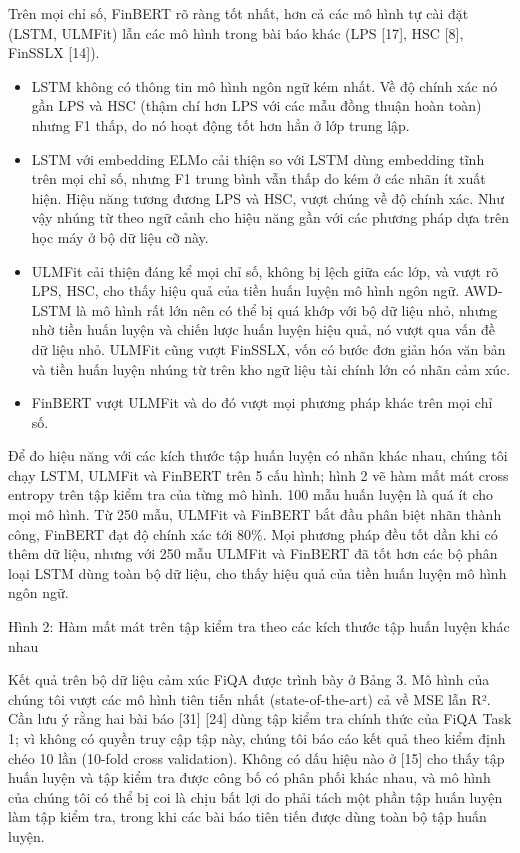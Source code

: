 Trên mọi chỉ số, FinBERT rõ ràng tốt nhất, hơn cả các mô hình tự cài đặt (LSTM, ULMFit) lẫn các mô hình trong bài báo khác (LPS {[}17{]}, HSC {[}8{]}, FinSSLX {[}14{]}).

\begin{itemize}
\item
  LSTM không có thông tin mô hình ngôn ngữ kém nhất. Về độ chính xác nó gần LPS và HSC (thậm chí hơn LPS với các mẫu đồng thuận hoàn toàn) nhưng F1 thấp, do nó hoạt động tốt hơn hẳn ở lớp trung lập.
\item
  LSTM với embedding ELMo cải thiện so với LSTM dùng embedding tĩnh trên mọi chỉ số, nhưng F1 trung bình vẫn thấp do kém ở các nhãn ít xuất hiện. Hiệu năng tương đương LPS và HSC, vượt chúng về độ chính xác. Như vậy nhúng từ theo ngữ cảnh cho hiệu năng gần với các phương pháp dựa trên học máy ở bộ dữ liệu cỡ này.
\item
  ULMFit cải thiện đáng kể mọi chỉ số, không bị lệch giữa các lớp, và vượt rõ LPS, HSC, cho thấy hiệu quả của tiền huấn luyện mô hình ngôn ngữ. AWD-LSTM là mô hình rất lớn nên có thể bị quá khớp với bộ dữ liệu nhỏ, nhưng nhờ tiền huấn luyện và chiến lược huấn luyện hiệu quả, nó vượt qua vấn đề dữ liệu nhỏ. ULMFit cũng vượt FinSSLX, vốn có bước đơn giản hóa văn bản và tiền huấn luyện nhúng từ trên kho ngữ liệu tài chính lớn có nhãn cảm xúc.
\item
  FinBERT vượt ULMFit và do đó vượt mọi phương pháp khác trên mọi chỉ số.
\end{itemize}

Để đo hiệu năng với các kích thước tập huấn luyện có nhãn khác nhau, chúng tôi chạy LSTM, ULMFit và FinBERT trên 5 cấu hình; hình 2 vẽ hàm mất mát cross entropy trên tập kiểm tra của từng mô hình. 100 mẫu huấn luyện là quá ít cho mọi mô hình. Từ 250 mẫu, ULMFit và FinBERT bắt đầu phân biệt nhãn thành công, FinBERT đạt độ chính xác tới 80\%. Mọi phương pháp đều tốt dần khi có thêm dữ liệu, nhưng với 250 mẫu ULMFit và FinBERT đã tốt hơn các bộ phân loại LSTM dùng toàn bộ dữ liệu, cho thấy hiệu quả của tiền huấn luyện mô hình ngôn ngữ.

Hình 2: Hàm mất mát trên tập kiểm tra theo các kích thước tập huấn luyện khác nhau

Kết quả trên bộ dữ liệu cảm xúc FiQA được trình bày ở Bảng 3. Mô hình của chúng tôi vượt các mô hình tiên tiến nhất (state-of-the-art) cả về MSE lẫn R². Cần lưu ý rằng hai bài báo {[}31{]} {[}24{]} dùng tập kiểm tra chính thức của FiQA Task 1; vì không có quyền truy cập tập này, chúng tôi báo cáo kết quả theo kiểm định chéo 10 lần (10-fold cross validation). Không có dấu hiệu nào ở {[}15{]} cho thấy tập huấn luyện và tập kiểm tra được công bố có phân phối khác nhau, và mô hình của chúng tôi có thể bị coi là chịu bất lợi do phải tách một phần tập huấn luyện làm tập kiểm tra, trong khi các bài báo tiên tiến được dùng toàn bộ tập huấn luyện.

